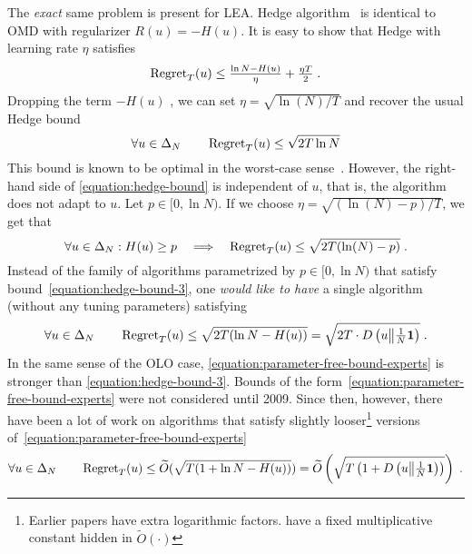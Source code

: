 The \emph{exact} same problem is present for \ac{LEA}.  Hedge algorithm~\citep{Freund-Schapire-1997}
is identical to \ac{OMD} with regularizer $R(u) = -H(u)$. It is easy to show that
Hedge with learning rate $\eta$ satisfies
\begin{equation}
\label{equation:hedge-bound-2}
\operatorname{Regret}_T(u) \le \tfrac{\ln N - H(u)}{\eta} + \tfrac{\eta T}{2} \; .
\end{equation}
Dropping the term $-H(u)$ , we can set $\eta = \sqrt{\ln(N)/T}$ and recover the usual
Hedge bound~\citep{Freund-Schapire-1997}
\begin{equation}
\label{equation:hedge-bound}
\forall u \in \Delta_N \qquad \operatorname{Regret}_T(u) \le \sqrt{2 T \ln N}
\end{equation}
This bound is known to be optimal in the worst-case sense~\cite[Section
3.7]{Cesa-Bianchi-Lugosi-2006}. However, the right-hand side of
\eqref{equation:hedge-bound} is independent of $u$, that is, the algorithm does
not adapt to $u$.  Let $p \in [0, \ln N)$. If we choose $\eta = \sqrt{(\ln(N) -
p)/T}$, we get that
\begin{equation}
\label{equation:hedge-bound-3}
\forall u \in \Delta_N: H(u) \ge p \quad \Longrightarrow \quad \operatorname{Regret}_T(u) \le \sqrt{2 T (\ln(N) - p)} \; .
\end{equation}
Instead of the family of algorithms parametrized by $p \in [0,\ln N)$ that
satisfy bound~\eqref{equation:hedge-bound-3}, one \emph{would like to have} a single
algorithm (without any tuning parameters) satisfying
\begin{equation}
\label{equation:parameter-free-bound-experts}
\forall u \in \Delta_N \qquad \operatorname{Regret}_T(u) \le \sqrt{2 T (\ln N - H(u))} = \sqrt{2T \cdot D\left({u}\middle\|{\tfrac{1}{N} \mathbf{1}}\right)} \; .
\end{equation}
In the same sense of the OLO case, \eqref{equation:parameter-free-bound-experts} is stronger than
\eqref{equation:hedge-bound-3}.
Bounds of the form~\eqref{equation:parameter-free-bound-experts} were not
considered until 2009. Since then, however, there have been a lot of work
\citep{Chaudhuri-Freund-Hsu-2009, Chernov-Vovk-2010, Koolen-van-Erven-2015,
Luo-Schapire-2014, Luo-Schapire-2015, Foster-Rakhlin-Sridharan-2015,
Orabona-Pal-2016-parameter-free} on algorithms that satisfy slightly
looser\footnote{Earlier papers have extra logarithmic factors.
\citet{Foster-Rakhlin-Sridharan-2015, Orabona-Pal-2016-parameter-free} have
a fixed multiplicative constant hidden in $\widetilde
O(\cdot)$} versions of~\eqref{equation:parameter-free-bound-experts}
$$
\forall u \in \Delta_N \qquad \operatorname{Regret}_T(u) \le \widetilde O(\sqrt{T (1 + \ln N - H(u))}) = \widetilde O\left(\sqrt{T \left(1 + D\left({u}\middle\|{\tfrac{1}{N}\mathbf{1}}\right) \right)} \right) \; .
$$

